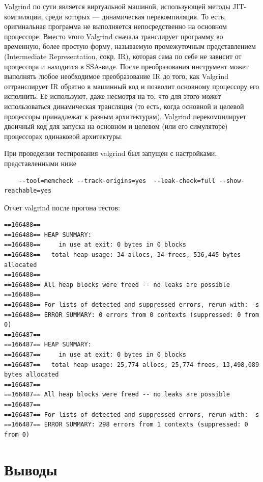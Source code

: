 \documentclass[a4paper,12pt]{report}
\begin{document}
Valgrind по сути является виртуальной машиной, использующей методы JIT-компиляции, среди которых — динамическая перекомпиляция. То есть, оригинальная программа не выполняется непосредственно на основном процессоре. Вместо этого Valgrind сначала транслирует программу во временную, более простую форму, называемую промежуточным представлением (Intermediate Representation, сокр. IR), которая сама по себе не зависит от процессора и находится в SSA-виде. После преобразования инструмент может выполнять любое необходимое преобразование IR до того, как Valgrind оттранслирует IR обратно в машинный код и позволит основному процессору его исполнить. Её используют, даже несмотря на то, что для этого может использоваться динамическая трансляция (то есть, когда основной и целевой процессоры принадлежат к разным архитектурам). Valgrind перекомпилирует двоичный код для запуска на основном и целевом (или его симуляторе) процессорах одинаковой архитектуры.

При проведении тестирования valgrind был запущен с настройками, представленными ниже
\begin{verbatim}
    --tool=memcheck --track-origins=yes  --leak-check=full --show-reachable=yes
\end{verbatim}

Отчет valgrind после прогона тестов:
\begin{verbatim}
==166488== 
==166488== HEAP SUMMARY:
==166488==     in use at exit: 0 bytes in 0 blocks
==166488==   total heap usage: 34 allocs, 34 frees, 536,445 bytes allocated
==166488== 
==166488== All heap blocks were freed -- no leaks are possible
==166488== 
==166488== For lists of detected and suppressed errors, rerun with: -s
==166488== ERROR SUMMARY: 0 errors from 0 contexts (suppressed: 0 from 0)
==166487== 
==166487== HEAP SUMMARY:
==166487==     in use at exit: 0 bytes in 0 blocks
==166487==   total heap usage: 25,774 allocs, 25,774 frees, 13,498,089 bytes allocated
==166487== 
==166487== All heap blocks were freed -- no leaks are possible
==166487== 
==166487== For lists of detected and suppressed errors, rerun with: -s
==166487== ERROR SUMMARY: 298 errors from 1 contexts (suppressed: 0 from 0)
\end{verbatim}





\chapter*{Выводы}
\end{document}
